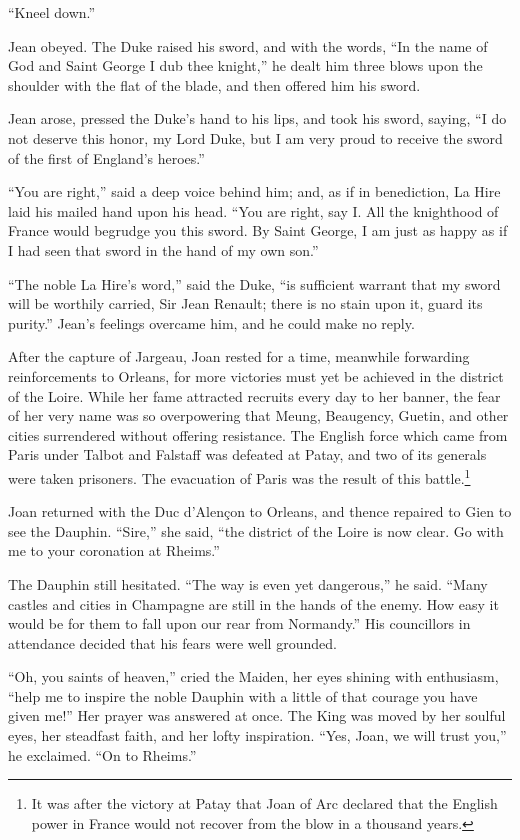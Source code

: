 ``Kneel down.''

Jean obeyed. The Duke raised his sword, and with the words, ``In the
name of God and Saint George I dub thee knight,'' he dealt him three
blows upon the shoulder with the flat of the blade, and then offered him
his sword.

Jean arose, pressed the Duke's hand to his lips, and took his sword,
saying, ``I do not deserve this honor, my Lord Duke, but I am very proud
to receive the sword of the first of England's heroes.''

``You are right,'' said a deep voice behind him; and, as if in
benediction, La Hire laid his mailed hand upon his head. ``You are
right, say I. All the knighthood of France would begrudge you this
sword. By Saint George, I am just as happy as if I had seen that sword
in the hand of my own son.''

``The noble La Hire's word,'' said the Duke, ``is sufficient warrant
that my sword will be worthily carried, Sir Jean Renault; there is no
stain upon it, guard its purity.'' Jean's feelings overcame him, and he
could make no reply.

After the capture of Jargeau, Joan rested for a time, meanwhile
forwarding reinforcements to Orleans, for more victories must yet be
achieved in the district of the Loire. While her fame attracted recruits
every day to her banner, the fear of her very name was so overpowering
that Meung, Beaugency, Guetin, and other cities surrendered without
offering resistance. The English force which came from Paris under
Talbot and Falstaff was defeated at Patay, and two of its generals were
taken prisoners. The evacuation of Paris was the result of this
battle.\footnote{It was after the victory at Patay that Joan of Arc
  declared that the English power in France would not recover from the
  blow in a thousand years.}

Joan returned with the Duc d'Alençon to Orleans, and thence repaired to
Gien to see the Dauphin. ``Sire,'' she said, ``the district of the Loire
is now clear. Go with me to your coronation at Rheims.''

The Dauphin still hesitated. ``The way is even yet dangerous,'' he said.
``Many castles and cities in Champagne are still in the hands of the
enemy. How easy it would be for them to fall upon our rear from
Normandy.'' His councillors in attendance decided that his fears were
well grounded.

``Oh, you saints of heaven,'' cried the Maiden, her eyes shining with
enthusiasm, ``help me to inspire the noble Dauphin with a little of that
courage you have given me!'' Her prayer was answered at once. The King
was moved by her soulful eyes, her steadfast faith, and her lofty
inspiration. ``Yes, Joan, we will trust you,'' he exclaimed. ``On to
Rheims.''

